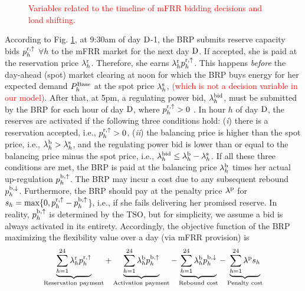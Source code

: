 \documentclass[11pt,a4paper]{article}
\begin{document}
\begin{figure}[b]
    \centering
    
    \caption{\textcolor{red}{Variables related to the timeline of mFRR bidding decisions and load shifting.}}
    \label{fig:timeline_mfrr_variables}
\end{figure}


According to Fig. \ref{fig:timeline_mfrr_variables}, at 9:30am of day $\rm{D}$-1, the BRP submits reserve capacity bids $p_{h}^{\rm{r},\uparrow}$ $\forall{h}$ to the mFRR market for the next day $\rm{D}$. If accepted, she is paid at the reservation price $\lambda_{h}^{\rm{r}}$. Therefore, she earns $\lambda_{h}^{\rm{r}}p_{h}^{\rm{r},\uparrow}$. This happens \textit{before} the day-ahead (spot) market clearing at noon for which the BRP buys energy for her expected demand $P_{h}^{\rm{Base}}$ at the spot price $\lambda_{h}^{\rm{s}}$, \textcolor{red}{(which is not a decision variable in our model)}. After that, at 5pm, a regulating power bid, $\lambda_{h}^{\rm{bid}}$, must be submitted by the BRP for each hour of day $\rm{D}$, where $p_{h}^{\rm{r},\uparrow} > 0$ \cite{energinet:Systemydelser}. In hour $h$ of day $\rm{D}$, the reserves are activated if the following three conditions hold: (\textit{i}) there is a reservation accepted, i.e., $p_{h}^{\rm{r},\uparrow} > 0$, (\textit{ii}) the balancing price is higher than the spot price, i.e., $\lambda_{h}^{\rm{b}} > \lambda_{h}^{\rm{s}}$, and the regulating power bid is lower than or equal to the balancing price minus the spot price, i.e., $\lambda_{h}^{\rm{bid}} \leq  \lambda_{h}^{\rm{b}} - \lambda_{h}^{\rm{s}}$. If all these three conditions are met, the BRP is paid at the balancing price $\lambda_{h}^{\rm{b}}$ times her actual up-regulation $p_{h}^{\rm{b},\uparrow}$. The BRP may  incur a cost due to any subsequent rebound $p_{h}^{\rm{b},\downarrow}$. Furthermore, the BRP should pay at the penalty price $\lambda^{\rm{p}}$ for $s_{h} = \text{max}\{0, p_{h}^{\rm{r},\uparrow} - p_{h}^{\rm{b},\uparrow}$\}, i.e., if she fails delivering her promised reserve. In reality, $p_{h}^{\rm{b},\uparrow}$ is determined by the TSO, but for simplicity, we assume a bid is always activated in its entirety.
Accordingly, the objective function of the BRP maximizing the flexibility value over a day (via mFRR provision) is
%
\begin{align}\label{eq:mFRRObjective}
    \underbrace{\sum_{h=1}^{24}\lambda_{h}^{\rm{r}} p^{\rm{r}, \uparrow}_{h}}_{\textrm{Reservation payment}} + \underbrace{\sum_{h=1}^{24}  \lambda_{h}^{\rm{b}} p^{\rm{b},\uparrow}_{h}}_{\textrm{Activation payment}} - \underbrace{\sum_{h=1}^{24}  \lambda_{h}^{\rm{b}} p^{\rm{b},\downarrow}_{h}}_{\textrm{Rebound cost}} - \underbrace{ \sum_{h=1}^{24}  \lambda^{\rm{p}}s_{h}}_{\textrm{Penalty cost}}
\end{align}
\end{document}
